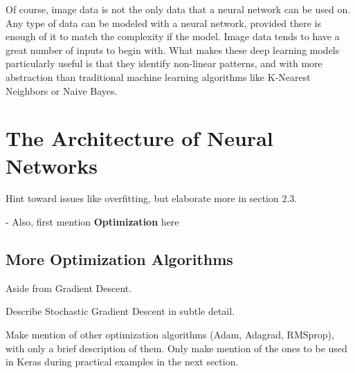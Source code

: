 Of course, image data is not the only data that a neural network can be used on.  Any type of data can be modeled with a neural network, provided there is enough of it to match the complexity if the model.  Image data tends to have a great number of inputs to begin with.  What makes these deep learning models particularly useful is that they identify non-linear patterns, and with more abstraction than traditional machine learning algorithms like K-Nearest Neighbors or Naive Bayes.



\section{The Architecture of Neural Networks} %

Hint toward issues like overfitting, but elaborate more in section 2.3.

- Also, first mention \textbf{Optimization} here

  





\subsection{More Optimization Algorithms}

Aside from Gradient Descent.

Describe Stochastic Gradient Descent in subtle detail.

Make mention of other optimization algorithms (Adam, Adagrad, RMSprop), with only a brief description of them.  Only make mention of the ones to be used in Keras during practical examples in the next section.

